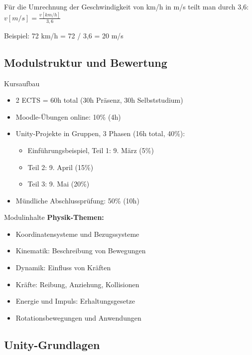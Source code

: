 \begin{example}
    Für die Umrechnung der Geschwindigkeit von km/h in m/s teilt man durch 3,6:
    $v[m/s] = \frac{v[km/h]}{3,6}$
    
    Beispiel: 72 km/h = 72 / 3,6 = 20 m/s
\end{example}

\subsection{Modulstruktur und Bewertung}

\begin{definition}{Kursaufbau}
    \begin{itemize}
        \item 2 ECTS = 60h total (30h Präsenz, 30h Selbststudium)
        \item Moodle-Übungen online: 10\% (4h)
        \item Unity-Projekte in Gruppen, 3 Phasen (16h total, 40\%):
        \begin{itemize}
            \item Einführungsbeispiel, Teil 1: 9. März (5\%)
            \item Teil 2: 9. April (15\%)
            \item Teil 3: 9. Mai (20\%)
        \end{itemize}
        \item Mündliche Abschlussprüfung: 50\% (10h)
    \end{itemize}
\end{definition}

\begin{concept}{Modulinhalte}
    \textbf{Physik-Themen:}
    \begin{itemize}
        \item Koordinatensysteme und Bezugssysteme
        \item Kinematik: Beschreibung von Bewegungen
        \item Dynamik: Einfluss von Kräften
        \item Kräfte: Reibung, Anziehung, Kollisionen
        \item Energie und Impuls: Erhaltungsgesetze
        \item Rotationsbewegungen und Anwendungen
    \end{itemize}
\end{concept}

\subsection{Unity-Grundlagen}

